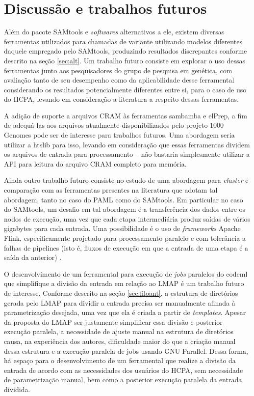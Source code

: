 \documentclass[cic,tc]{iiufrgs}
\begin{document}
\section{Discussão e trabalhos futuros}

Além do pacote SAMtools e \textit{softwares} alternativos a ele, existem
diversas ferramentas utilizados para chamadas de variante utilizando modelos
diferentes daquele empregado pelo SAMtools, produzindo resultados discrepantes
conforme descrito na seção \ref{sec:alt}. Um trabalho futuro consiste em
explorar o uso dessas ferramentas junto aos pesquisadores do grupo de pesquisa
em genética, com avaliação tanto de seu desempenho como da aplicabilidade desse
ferramental considerando os resultados potencialmente diferentes entre si, para
o caso de uso do HCPA, levando em consideração a literatura a respeito dessas
ferramentas.

A adição de suporte a arquivos CRAM às ferramentas sambamba e elPrep, a fim de
adequá-las aos arquivos atualmente disponibilizados pelo projeto 1000 Genomes
pode ser de interesse para trabalhos futuros. Uma abordagem seria utilizar a
htslib para isso, levando em consideração que essas ferramentas dividem os
arquivos de entrada para processamento -- não bastaria simplesmente utilizar a
API para leitura do arquivo CRAM completo para memória.

Ainda outro trabalho futuro consiste no estudo de uma abordagem para
\textit{cluster} e comparação com as ferramentas presentes na literatura que
adotam tal abordagem, tanto no caso do PAML como do SAMtools. Em particular no
caso do SAMtools, um desafio em tal abordagem é a transferência dos dados entre
os nodos de execução, uma vez que cada etapa intermediária produz saídas de
vários gigabytes para cada entrada. Uma possibilidade é o uso de
\textit{frameworks} Apache Flink, especificamente projetado para processamento
paralelo e com tolerância a falhas de pipelines (isto é, fluxos de execução em
que a entrada de uma etapa é a saída da anterior) \cite{carbone2015apache}.

O desenvolvimento de um ferramental para execução de \textit{jobs} paralelos do
codeml que simplifique a divisão da entrada em relação ao LMAP é um trabalho
futuro de interesse. Conforme descrito na seção \ref{sec:filoant}, a estrutura
de diretórios gerada pelo LMAP para dividir a entrada precisa ser manualmente
afinada à parametrização desejada, uma vez que ela é criada a partir de
\textit{templates}. Apesar da proposta do LMAP ser justamente simplificar essa
divisão e posterior execução paralela, a necessidade de ajuste manual na
estrutura de diretórios causa, na experiência dos autores, dificuldade maior do
que a criação manual dessa estrutura e a execução paralela de jobs usando GNU
Parallel. Dessa forma, há espaço para o desenvolvimento de um ferramental que
realize a divisão da entrada de acordo com as necessidades dos usuários do
HCPA, sem necessidade de parametrização manual, bem como a posterior execução
paralela da entrada dividida.
\end{document}

